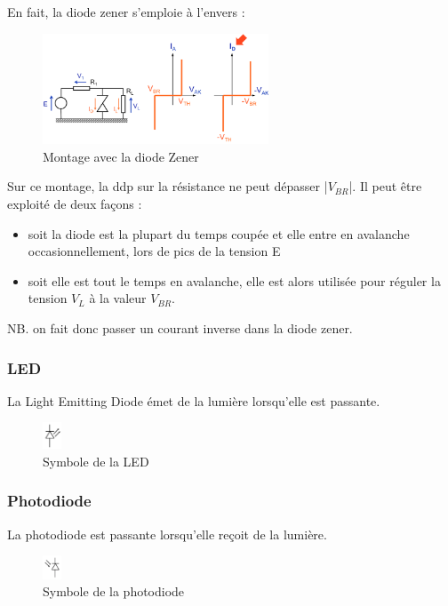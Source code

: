 \documentclass[a4paper]{article}
\begin{document}
    En fait, la diode zener s'emploie à l'envers :

    \begin{figure}[H]
        \begin{center}
            \includegraphics[width=0.6\textwidth]{fig/5_zenermontage.png}
            \caption{Montage avec la diode Zener}
            \label{fig:5_zenermontage}
        \end{center}
    \end{figure}
    Sur ce montage, la ddp sur la résistance ne peut dépasser |$V_{BR}$|. Il peut
    être exploité de deux façons :
    \begin{itemize}
        \item soit la diode est la plupart du temps coupée et elle entre en avalanche
        occasionnellement, lors de pics de la tension E
        \item soit elle est tout le temps en avalanche, elle est alors utilisée
        pour réguler la tension $V_L$ à la valeur $V_{BR}$.
    \end{itemize}
    NB. on fait donc passer un courant inverse dans la diode zener.

    \subsubsection{LED}
    La Light Emitting Diode émet de la lumière lorsqu'elle est passante.
    \begin{figure}[H]
        \begin{center}
            \includegraphics[width=0.05\textwidth]{fig/5_led.png}
            \caption{Symbole de la LED}
            \label{fig:5_led}
        \end{center}
    \end{figure}

    \subsubsection{Photodiode}
    La photodiode est passante lorsqu'elle reçoit de la lumière.
    \begin{figure}[H]
        \begin{center}
            \includegraphics[width=0.05\textwidth]{fig/5_photodiode.png}
            \caption{Symbole de la photodiode}
            \label{fig:5_photodiode}
        \end{center}
    \end{figure}
\end{document}
